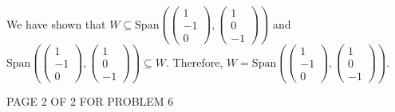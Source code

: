 \documentclass[12pt]{article}
\newenvironment{problem}[2][Problem]
{
	\begin{trivlist} 
		\item[\hskip \labelsep {\bfseries #1 #2:}]
	}
{
	\end{trivlist}
	}
\begin{document}
\begin{problem}{6}
We have shown that $W\subseteq \text{Span}\left(\begin{pmatrix}1\\-1\\0\end{pmatrix}, \begin{pmatrix}1\\0\\-1\end{pmatrix}\right)$ and $\text{Span}\left(\begin{pmatrix}1\\-1\\0\end{pmatrix}, \begin{pmatrix}1\\0\\-1\end{pmatrix}\right)\subseteq W$. Therefore, $W=\text{Span}\left(\begin{pmatrix}1\\-1\\0\end{pmatrix}, \begin{pmatrix}1\\0\\-1\end{pmatrix}\right)$.
\vfill
\centerline{PAGE 2 OF 2 FOR PROBLEM 6}
\end{problem}
\end{document}
